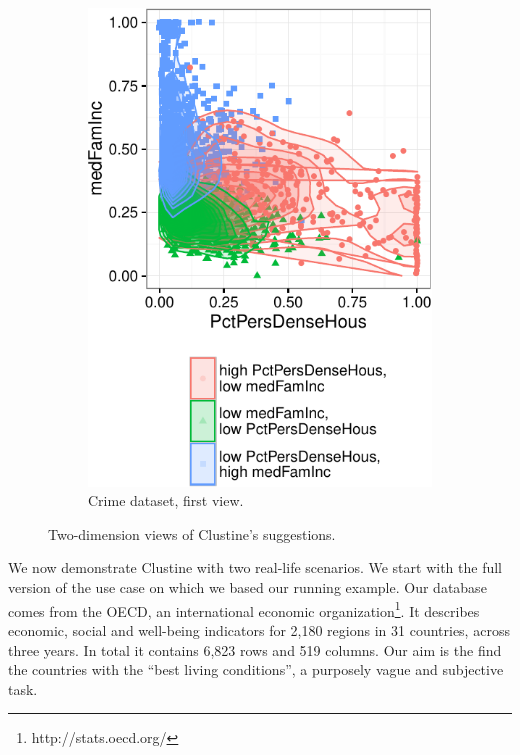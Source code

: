 \begin{figure}[t!]
\begin{subfigure}[b]{0.48\columnwidth}
        \includegraphics[width=\textwidth]{Experiments/Case2Validation1}
        \caption{Crime dataset, first view.}
        \label{fig:validation2}
    \end{subfigure}
    \caption{Two-dimension views of Clustine's suggestions.}\label{fig:propvis}
\end{figure}

We now demonstrate Clustine with two real-life scenarios.  We start with the
full version of the use case on which we based our running example. Our
database comes from the OECD, an international economic
organization\footnote{http://stats.oecd.org/}. It describes economic, social
and well-being indicators for 2,180 regions in 31 countries, across three
years. In total it contains 6,823 rows and 519 columns. Our aim is the find the
countries with the ``best living conditions'', a purposely vague and subjective
task.

